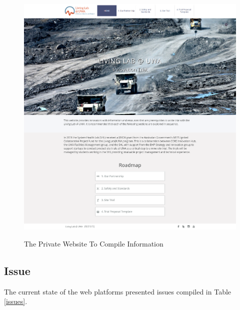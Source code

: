 \begin{figure}
\begin{center}
  \includegraphics[width=\textwidth]{BaseCase/private-website.png} \\
  \caption{The Private Website To Compile Information} \label{privateWebsiteIMG}
\end{center}
\end{figure}

\subsection{Issue}
The current state of the web platforms presented issues compiled in Table \ref{issues}.

